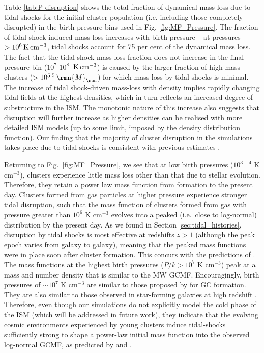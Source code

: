 \documentclass[fleqn,usenatbib]{mnras}
\newcommand\Msun{\,\rmn{M}_{\sun}}
\newcommand{\K}              {\,{\rm K}}
\newcommand{\cmcubed}              {\,{\rm cm}^{-3}}
\begin{document}
Table \ref{tab:P-disruption} shows the total fraction of dynamical mass-loss due to tidal shocks for the initial cluster population (i.e. including those completely disrupted) in the birth pressure bins used in Fig. \ref{fig:MF_Pressure}. The fraction of tidal shock-induced mass-loss increases with birth pressure -- at pressures $> 10^6 \K \cmcubed$, tidal shocks account for 75 per cent of the dynamical mass loss. 
The fact that the tidal shock mass-loss fraction does not increase in the final pressure bin ($10^7$-$10^8$ $\K \cmcubed$) is caused by the larger fraction of high-mass clusters ($>10^{5.5} \Msun$) for which mass-loss by tidal shocks is minimal. 
The increase of tidal shock-driven mass-loss with density implies rapidly changing tidal fields at the highest densities, which in turn reflects an increased degree of substructure in the ISM. The monotonic nature of this increase also suggests that disruption will further increase as higher densities can be realised with more detailed ISM models (up to some limit, imposed by the density distribution function).
Our finding that the majority of cluster disruption in the simulations takes place due to tidal shocks is consistent with previous estimates \citep{Lamers_and_Gieles_06,Kruijssen_et_al_11}.

Returning to Fig.~\ref{fig:MF_Pressure}, we see that at low birth pressures ($10^{3-4}$ K cm$^{-3}$), clusters experience little mass loss other than that due to stellar evolution. Therefore, they retain a power law mass function from formation to the present day. Clusters formed from gas particles at higher pressure experience stronger tidal disruption, such that the mass function of clusters formed from gas with pressure greater than $10^6$ K cm$^{-3}$ evolves into a peaked (i.e.~close to log-normal) distribution by the present day. As we found in Section \ref{sec:tidal_histories}, disruption by tidal shocks is most effective at redshifts $z>1$ (although the peak epoch varies from galaxy to galaxy), meaning that the peaked mass functions were in place soon after cluster formation. This concurs with the predictions of \citet{Kruijssen_15}.
The mass functions at the highest birth pressures ($P/k > 10^7$ K cm$^{-3}$) peak at a mass and number density that is similar to the MW GCMF. Encouragingly, birth pressures of $\sim 10^7$ K cm$^{-3}$ are similar to those proposed by \citet{Elmegreen_and_Efremov_97} for GC formation. They are also similar to those observed in star-forming galaxies at high redshift \citep[e.g.][]{Swinbank_et_al_11}. Therefore, even though our simulations do not explicitly model the cold phase of the ISM (which will be addressed in future work), they indicate that the evolving cosmic environments experienced by young clusters induce tidal-shocks sufficiently strong to shape a power-law initial mass function into the observed log-normal GCMF, as predicted by \citet[][]{Elmegreen_10} and \citet{Kruijssen_15}.
\end{document}
